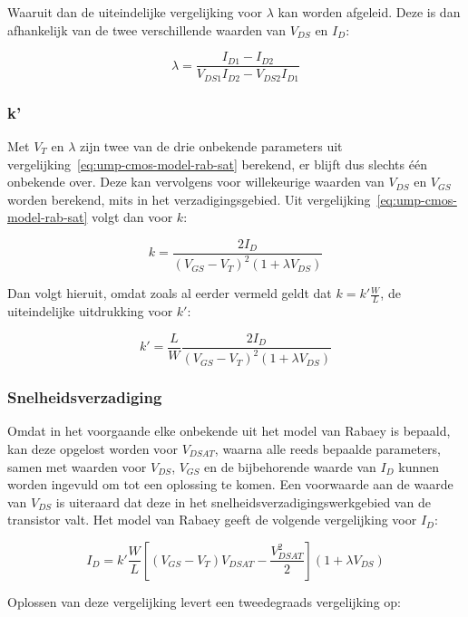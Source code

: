 \documentclass{scrartcl}
\begin{document}
Waaruit dan de uiteindelijke vergelijking voor $\lambda$ kan worden afgeleid. Deze is dan afhankelijk van de twee verschillende waarden van $V_{DS}$ en $I_{D}$:

\begin{equation} \label{eq:ump-lambda}
	\lambda = \frac{I_{D1} - I_{D2}}{V_{DS1}I_{D2} - V_{DS2}I_{D1}}
\end{equation}

\subsubsection{k'}
\label{subsubsec:ump-methode-verw-kprime}
Met $V_{T}$ en $\lambda$ zijn twee van de drie onbekende parameters uit vergelijking~\ref{eq:ump-cmos-model-rab-sat} berekend, er blijft dus slechts één onbekende over. Deze kan vervolgens voor willekeurige waarden van $V_{DS}$ en $V_{GS}$ worden berekend, mits in het verzadigingsgebied. Uit vergelijking~\ref{eq:ump-cmos-model-rab-sat} volgt dan voor $k$:

$$k = \frac{2I_{D}}{(V_{GS} - V_{T})^2(1 + \lambda V_{DS})}$$

Dan volgt hieruit, omdat zoals al eerder vermeld geldt dat $k = k'\frac{W}{L}$, de uiteindelijke uitdrukking voor $k'$:

\begin{equation} \label{eq:ump-kprime}
	k' = \frac{L}{W}\frac{2I_{D}}{(V_{GS} - V_{T})^2(1 + \lambda V_{DS})}
\end{equation}

\subsubsection{Snelheidsverzadiging}
\label{subsubsec:ump-methode-verw-vdsat}
Omdat in het voorgaande elke onbekende uit het model van Rabaey is bepaald, kan deze opgelost worden voor $V_{DSAT}$, waarna alle reeds bepaalde parameters, samen met waarden voor $V_{DS}$, $V_{GS}$ en de bijbehorende waarde van $I_{D}$ kunnen worden ingevuld om tot een oplossing te komen. Een voorwaarde aan de waarde van $V_{DS}$ is uiteraard dat deze in het snelheidsverzadigingswerkgebied van de transistor valt. Het model van Rabaey geeft de volgende vergelijking voor $I_{D}$:

\begin{equation}
	I_{D} = k' \frac{W}{L}[(V_{GS} - V_{T})V_{DSAT} - \frac{V_{DSAT}^2}{2}](1 + \lambda V_{DS})
\end{equation}

Oplossen van deze vergelijking levert een tweedegraads vergelijking op:
\end{document}
